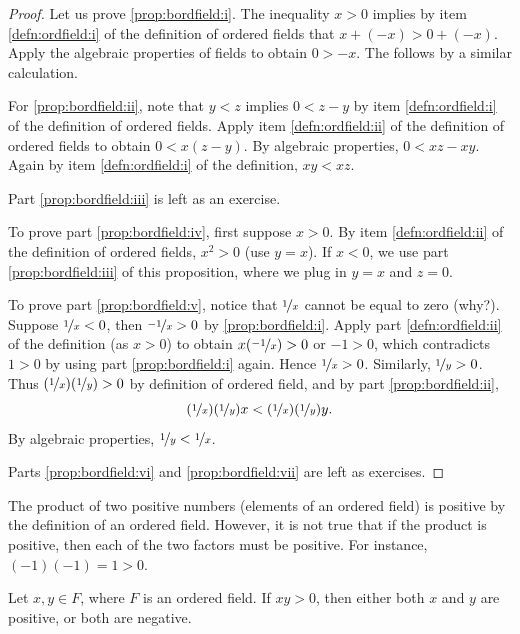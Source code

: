 \begin{proof}
Let us prove \ref{prop:bordfield:i}.  The inequality $x > 0$ implies by item
\ref{defn:ordfield:i} of the definition of ordered fields that
$x + (-x) > 0 + (-x)$.  Apply the algebraic properties of fields to
obtain $0 > -x$.  The  follows by a similar calculation.

For \ref{prop:bordfield:ii}, note that $y < z$ implies
$0 < z - y$ by
item \ref{defn:ordfield:i} of the definition of ordered fields.
Apply item
\ref{defn:ordfield:ii} of the definition of ordered fields to obtain
$0 < x(z-y)$.  By algebraic properties, $0 < xz - xy$.
Again by item
\ref{defn:ordfield:i} of the definition, $xy < xz$.

Part \ref{prop:bordfield:iii} is left as an exercise.

To prove part \ref{prop:bordfield:iv}, first suppose $x > 0$.
By item \ref{defn:ordfield:ii} of the definition of ordered fields,
$x^2 > 0$ (use $y=x$).  If $x < 0$, we use
part \ref{prop:bordfield:iii} of this proposition, where we plug in $y=x$ and
$z=0$.

To prove part \ref{prop:bordfield:v}, notice that
$\nicefrac{1}{x}$ cannot be equal to zero (why?).
Suppose $\nicefrac{1}{x} < 0$,
then $\nicefrac{-1}{x} > 0$ by \ref{prop:bordfield:i}.
Apply part \ref{defn:ordfield:ii} of the definition (as $x > 0$) to obtain
$x(\nicefrac{-1}{x}) > 0$ or $-1 > 0$, which contradicts $1 > 0$ by using part
\ref{prop:bordfield:i} again.  Hence $\nicefrac{1}{x} > 0$.
Similarly, $\nicefrac{1}{y} > 0$.  Thus $(\nicefrac{1}{x})(\nicefrac{1}{y}) > 0$
by definition of ordered field, and by part \ref{prop:bordfield:ii},
\begin{equation*}
(\nicefrac{1}{x})(\nicefrac{1}{y})x < (\nicefrac{1}{x})(\nicefrac{1}{y})y .
\end{equation*}
By algebraic properties, $\nicefrac{1}{y} < \nicefrac{1}{x}$.

Parts \ref{prop:bordfield:vi} and \ref{prop:bordfield:vii} are left as
exercises.
\end{proof}

The product of two positive numbers (elements of an ordered field) is positive
by the definition of an ordered field.
However, it is not true that if the product is positive, then each of the two
factors must be positive.  For instance, $(-1)(-1) = 1 > 0$.

\begin{prop}
Let $x,y \in F$, where $F$ is an ordered field.  If
$xy > 0$, then either both $x$ and $y$ are positive, or both are negative.
\end{prop}

